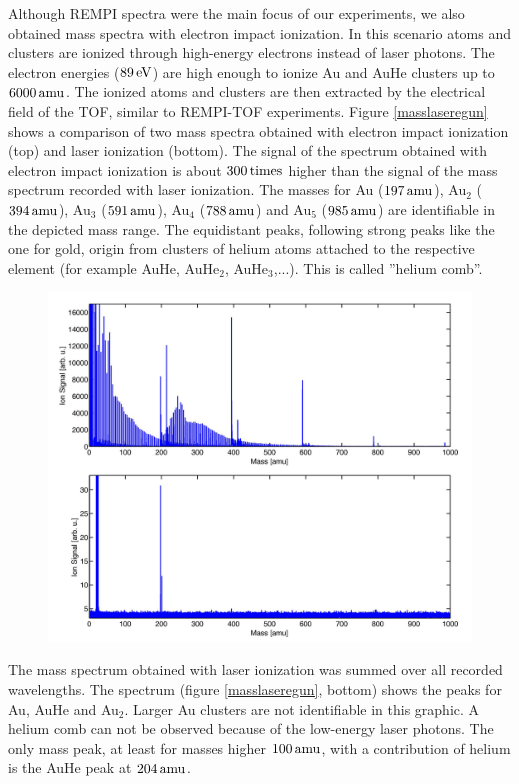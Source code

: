 \documentclass[parskip,12pt,headsepline,a4paper] {scrbook}
\begin{document}
Although REMPI spectra were the main focus of our experiments, we also obtained mass spectra with electron impact ionization. In this scenario atoms and clusters are ionized through high-energy electrons instead of laser photons. The electron energies ($\unit[89]{eV}$) are high enough to ionize Au and AuHe clusters up to $\unit[6000]{amu}$. The ionized atoms and clusters are then extracted by the electrical field of the TOF, similar to REMPI-TOF experiments. Figure \ref{masslaseregun} shows a comparison of two mass spectra obtained with electron impact ionization (top) and laser ionization (bottom). The signal of the spectrum obtained with electron impact ionization is about $\unit[300]{times}$ higher than the signal of the mass spectrum recorded with laser ionization. The masses for Au ($\unit[197]{amu}$), Au$_2$ ($\unit[394]{amu}$), Au$_3$ ($\unit[591]{amu}$), Au$_4$ ($\unit[788]{amu}$) and Au$_5$ ($\unit[985]{amu}$) are identifiable in the depicted mass range. The equidistant peaks, following strong peaks like the one for gold, origin from clusters of helium atoms attached to the respective element (for example AuHe, AuHe$_2$, AuHe$_3$,...). This is called ''helium comb''.
\begin{figure}[ht]
\centerline{
\includegraphics[width=17cm]{./results/mass_egun_laser.jpg}}
\end{figure}
The mass spectrum obtained with laser ionization was summed over all recorded wavelengths. The spectrum (figure \ref{masslaseregun}, bottom) shows the peaks for Au, AuHe and Au$_2$. Larger Au clusters are not identifiable in this graphic. A helium comb can not be observed because of the low-energy laser photons. The only mass peak, at least for masses higher $\unit[100]{amu}$, with a contribution of helium is the AuHe peak at $\unit[204]{amu}$.
\end{document}
